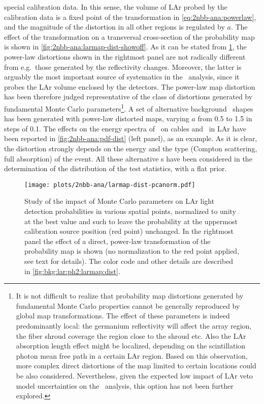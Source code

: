 \begin{description}[wide]
    special calibration data. In this sense, the volume of LAr probed by the calibration
    data is a fixed point of the transformation in \cref{eq:2nbb-ana:powerlaw}, and the
    magnitude of the distortion in all other regions is regulated by $a$. The effect of
    the transformation on a transversal cross-section of the probability map is shown in
    \cref{fig:2nbb-ana:larmap-dist-showoff}.
    \newpar
    As it can be stated from \cref{fig:2nbb-ana:dist-pcanorm}, the power-law distortions
    shown in the rightmost panel are not radically different from e.g.~those generated by
    the reflectivity changes. Moreover, the latter is arguably the most important source
    of systematics in the \nnbb\ analysis, since it probes the LAr volume enclosed by the
    detectors. The power-law map distortion has been therefore judged representative
    of the class of distortions generated by fundamental Monte Carlo parameters\footnote{%
      It is not difficult to realize that probability map distortions generated by
      fundamental Monte Carlo properties cannot be generally reproduced by global map
      transformations. The effect of these parameters is indeed predominantly local: the
      germanium reflectivity will affect the array region, the fiber shroud coverage the
      region close to the shroud etc. Also the LAr absorption length effect might be
      localized, depending on the scintillation photon mean free path in a certain LAr
      region.  Based on this observation, more complex direct distortions of the map
      limited to certain locations could be also considered. Nevertheless, given the
      expected low impact of LAr veto model uncertainties on the \nnbb\ analysis, this
      option has not been further explored.
    }.
    \newpar
    A set of alternative background \pdf\ shapes has been generated with power-law distorted
    maps, varying $a$ from 0.5 to 1.5 in steps of 0.1. The effects on the energy
    spectra of \kvn\ on cables and \kvz\ in LAr have been reported in
    \cref{fig:2nbb-ana:pdf-dist} (left panel), as an example. As it is clear, the
    distortion strongly depends on the energy and the type (Compton scattering, full
    absorption) of the event. All these alternative \pdf{}s have been considered in the
    determination of the distribution of the test statistics, with a flat prior.

    \begin{figure}
      \centering
      \texttt{[image: plots/2nbb-ana/larmap-dist-pcanorm.pdf]}
      \caption{%
        Study of the impact of Monte Carlo parameters on LAr light detection probabilities in
        various spatial points, normalized to unity at the best value and such to leave the
        probability at the uppermost calibration source position (red point) unchanged. In
        the rightmost panel the effect of a direct, power-law transformation of the
        probability map is shown (no normalization to the red point applied, see text for
        details). The color code and other details are described in
        \cref{fig:bkg:lar:ph2:larmap:dist}.
      }\label{fig:2nbb-ana:dist-pcanorm}
    \end{figure}


\end{description}

